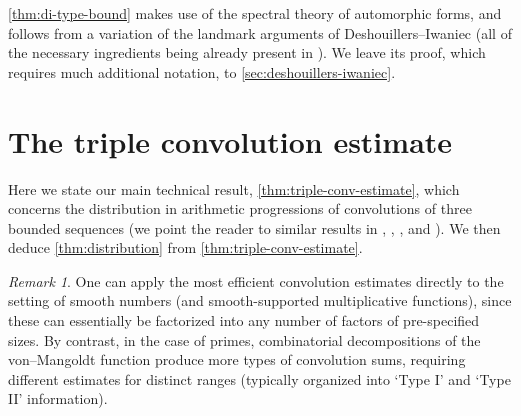 \documentclass[reqno,11pt]{amsart}
\theoremstyle{definition}
\theoremstyle{remark}
\newtheorem*{remark}{Remark}
\numberwithin{equation}{section}
\begin{document}
\cref{thm:di-type-bound} makes use of the spectral theory of automorphic forms, and follows from a variation of the landmark arguments of Deshouillers--Iwaniec (all of the necessary ingredients being already present in \cite{deshouillers1982kloosterman}). We leave its proof, which requires much additional notation, to \cref{sec:deshouillers-iwaniec}.







\section{The triple convolution estimate} \label{sec:triple-conv-estimate}

Here we state our main technical result, \cref{thm:triple-conv-estimate}, which concerns the distribution in arithmetic progressions of convolutions of three bounded sequences (we point the reader to similar results in \cite[Theorem 4]{bombieri1986primes}, \cite[Th\'eor\`eme 3]{drappeau2015theoremes}, \cite[Lemma 2.3]{drappeau2017smooth}, and \cite[Proposition 8.3]{maynard2020primes}). We then deduce \cref{thm:distribution} from \cref{thm:triple-conv-estimate}.

\begin{remark}
One can apply the most efficient convolution estimates directly to the setting of smooth numbers (and smooth-supported multiplicative functions), since these can essentially be factorized into any number of factors of pre-specified sizes. By contrast, in the case of primes, combinatorial decompositions of the von--Mangoldt function produce more types of convolution sums, requiring different estimates for distinct ranges (typically organized into `Type I' and `Type II' information).
\end{remark}
\end{document}
